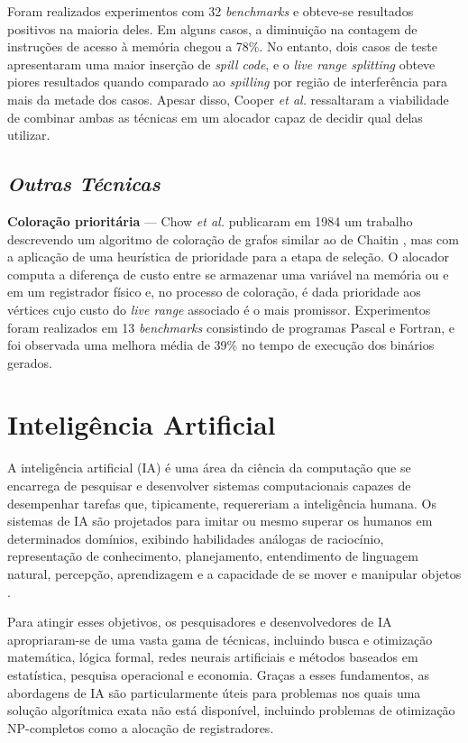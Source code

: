 \documentclass[
	12pt,				%
	openright,			%
	twoside,			%
	a4paper,			%
	tcc,			%
	]{ABNT-DC-UEL}
\begin{document}
Foram realizados experimentos com 32 \textit{benchmarks} e obteve-se resultados positivos na maioria deles. Em alguns casos, a diminuição na contagem de instruções de acesso à memória chegou a 78\%. No entanto, dois casos de teste apresentaram uma maior inserção de \textit{spill code}, e o \textit{live range splitting} obteve piores resultados quando comparado ao \textit{spilling} por região de interferência para mais da metade dos casos. Apesar disso, Cooper \textit{et al.} ressaltaram a viabilidade de combinar ambas as técnicas em um alocador capaz de decidir qual delas utilizar.

\section{\textit{Outras Técnicas}}

\textbf{Coloração prioritária} --- Chow \textit{et al.} publicaram em 1984 um trabalho descrevendo um algoritmo de coloração de grafos similar ao de Chaitin \cite{chaitin:82}, mas com a aplicação de uma heurística de prioridade para a etapa de seleção. O alocador computa a diferença de custo entre se armazenar uma variável na memória ou e em um registrador físico e, no processo de coloração, é dada prioridade aos vértices cujo custo do \textit{live range} associado é o mais promissor. Experimentos foram realizados em 13 \textit{benchmarks} consistindo de programas Pascal e Fortran, e foi observada uma melhora média de 39\% no tempo de execução dos binários gerados.

\chapter{Inteligência Artificial}

A inteligência artificial (IA) é uma área da ciência da computação que se encarrega de pesquisar e desenvolver sistemas computacionais capazes de desempenhar tarefas que, tipicamente, requereriam a inteligência humana. Os sistemas de IA são projetados para imitar ou mesmo superar os humanos em determinados domínios, exibindo habilidades análogas de raciocínio, representação de conhecimento, planejamento, entendimento de linguagem natural, percepção, aprendizagem e a capacidade de se mover e manipular objetos \cite{russell:21}.

Para atingir esses objetivos, os pesquisadores e desenvolvedores de IA apropriaram-se de uma vasta gama de técnicas, incluindo busca e otimização matemática, lógica formal, redes neurais artificiais e métodos baseados em estatística, pesquisa operacional e economia. Graças a esses fundamentos, as abordagens de IA são particularmente úteis para problemas nos quais uma solução algorítmica exata não está disponível, incluindo problemas de otimização NP-completos \cite{russell:21} como a alocação de registradores.
\end{document}
